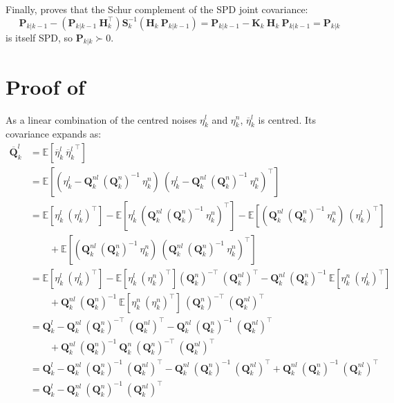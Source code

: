Finally,  proves that the Schur complement of the SPD joint covariance:
\begin{equation}
	\mathbf{P}_{k|k-1}-\left(\mathbf{P}_{k|k-1}\:\mathbf{H}_k^\top\right)\mathbf{S}_k^{-1}\left(\mathbf{H}_k\:\mathbf{P}_{k|k-1}\right)=\mathbf{P}_{k|k-1}-\mathbf{K}_k\:\mathbf{H}_k\:\mathbf{P}_{k|k-1}=\mathbf{P}_{k|k}
\end{equation}
is itself SPD, so $\mathbf{P}_{k|k}\succ0$.

\section[Proof of Proposition 2.10]{Proof of }\label{sec:proof_RBPF}

As a linear combination of the centred noises $\eta_k^l$ and $\eta_k^n$, $\overline{\eta}_k^l$ is centred. Its covariance expands as:
\begin{equation}
	\begin{aligned}
	\overline{\mathbf{Q}}_k^l&=\mathbb{E}\left[\overline{\eta}_k^l\:{\overline{\eta}_k^l}^\top\right]\\
	&=\mathbb{E}\left[(\eta_k^l-\mathbf{Q}_k^{nl}\:(\mathbf{Q}_k^n)^{-1}\:\eta_k^n)\:(\eta_k^l-\mathbf{Q}_k^{nl}\:(\mathbf{Q}_k^n)^{-1}\:\eta_k^n)^\top\right]\\
	&=\mathbb{E}\left[\eta_k^l\:(\eta_k^l)^\top\right]-\mathbb{E}\left[\eta_k^l\:(\mathbf{Q}_k^{nl}\:(\mathbf{Q}_k^n)^{-1}\:\eta_k^n)^\top\right]-\mathbb{E}\left[(\mathbf{Q}_k^{nl}\:(\mathbf{Q}_k^n)^{-1}\:\eta_k^n)\:(\eta_k^l)^\top\right]\\
	&\qquad+\mathbb{E}\left[(\mathbf{Q}_k^{nl}\:(\mathbf{Q}_k^n)^{-1}\:\eta_k^n)\:(\mathbf{Q}_k^{nl}\:(\mathbf{Q}_k^n)^{-1}\:\eta_k^n)^\top\right]\\
	&=\mathbb{E}\left[\eta_k^l\:(\eta_k^l)^\top\right]-\mathbb{E}\left[\eta_k^l\:(\eta_k^n)^\top\right](\mathbf{Q}_k^n)^{-\top}\:(\mathbf{Q}_k^{nl})^\top-\mathbf{Q}_k^{nl}\:(\mathbf{Q}_k^n)^{-1}\:\mathbb{E}\left[\eta_k^n\:(\eta_k^l)^\top\right]\\
	&\qquad+\mathbf{Q}_k^{nl}\:(\mathbf{Q}_k^n)^{-1}\:\mathbb{E}\left[\eta_k^n\:(\eta_k^n)^\top\right]\:(\mathbf{Q}_k^n)^{-\top}\:(\mathbf{Q}_k^{nl})^\top\\
	&=\mathbf{Q}_k^l-\mathbf{Q}_k^{nl}\:(\mathbf{Q}_k^n)^{-\top}\:(\mathbf{Q}_k^{nl})^\top-\mathbf{Q}_k^{nl}\:(\mathbf{Q}_k^n)^{-1}\:(\mathbf{Q}_k^{nl})^\top\\
	&\qquad+\mathbf{Q}_k^{nl}\:(\mathbf{Q}_k^n)^{-1}\:\mathbf{Q}_k^n\:(\mathbf{Q}_k^n)^{-\top}\:(\mathbf{Q}_k^{nl})^\top\\
	&=\mathbf{Q}_k^l-\mathbf{Q}_k^{nl}\:(\mathbf{Q}_k^n)^{-1}\:(\mathbf{Q}_k^{nl})^\top-\mathbf{Q}_k^{nl}\:(\mathbf{Q}_k^n)^{-1}\:(\mathbf{Q}_k^{nl})^\top+\mathbf{Q}_k^{nl}\:(\mathbf{Q}_k^n)^{-1}\:(\mathbf{Q}_k^{nl})^\top\\
	&=\mathbf{Q}_k^l-\mathbf{Q}_k^{nl}\:(\mathbf{Q}_k^n)^{-1}\:(\mathbf{Q}_k^{nl})^\top
	\end{aligned}
\end{equation}

